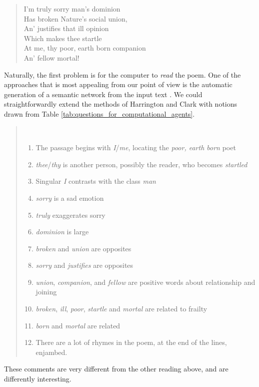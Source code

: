 {\itshape
\begin{verse}
I'm truly sorry man's dominion\\
Has broken Nature's social union,\\
An' justifies that ill opinion\\
Which makes thee startle\\
At me, thy poor, earth born companion\\
An' fellow mortal!\\
\end{verse}
}

Naturally, the first problem is for the computer to \emph{read} the
poem.  One of
the approaches that is most appealing from our point of view is the
automatic generation of a semantic network from the input text
\cite{harrington2007asknet}.  We could straightforwardly extend the methods of Harrington
and Clark with notions drawn from Table
\ref{tab:questions_for_computational_agents}.

\begin{quotation}
~\vspace{-1\baselineskip}
\begin{enumerate}
\item The passage begins with \emph{I}/\emph{me}, locating the \emph{poor, earth born} poet
\item \emph{thee}/\emph{thy} is another person, possibly the reader, who becomes \emph{startled}
\item Singular \emph{I} contrasts with the class \emph{man}
\item \emph{sorry} is a sad emotion
\item \emph{truly} exaggerates sorry
\item \emph{dominion} is large
\item \emph{broken} and \emph{union} are opposites
\item \emph{sorry} and \emph{justifies} are opposites
\item \emph{union}, \emph{companion}, and \emph{fellow} are positive words about relationship and joining
\item \emph{broken}, \emph{ill}, \emph{poor}, \emph{startle} and \emph{mortal} are related to frailty
\item \emph{born} and \emph{mortal} are related
\item There are a lot of rhymes in the poem, at the end of the lines, enjambed.
\end{enumerate}
\end{quotation}
These comments are very different from the other reading above, and are differently interesting.

